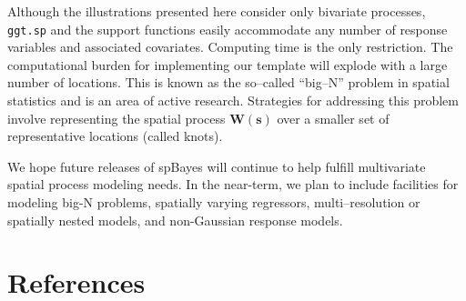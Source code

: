 \documentclass[a4paper]{article}
\newcommand{\bs}{\textbf{s}}
\newcommand{\bW}{\textbf{W}}
\let\code=\texttt
\newcommand{\pkg}[1]{{\normalfont\fontseries{b}\selectfont #1}}
\begin{document}
Although the illustrations presented here consider only bivariate processes, \code{ggt.sp} and the support functions easily accommodate any number of response variables and associated covariates.  Computing time is the only restriction.  The computational burden for implementing our template will explode with a large number of locations. This is known as the so--called ``big--N'' problem in spatial statistics and is an area of active research. Strategies for addressing this problem involve representing the spatial process $\bW(\bs)$ over a smaller set of representative locations (called knots).

We hope future releases of \pkg{spBayes} will continue to help fulfill multivariate spatial process modeling needs.  In the near-term, we plan to include facilities for modeling big-N problems, spatially varying regressors, multi--resolution or spatially nested models, and non-Gaussian response models.

\section{References}
\end{document}
